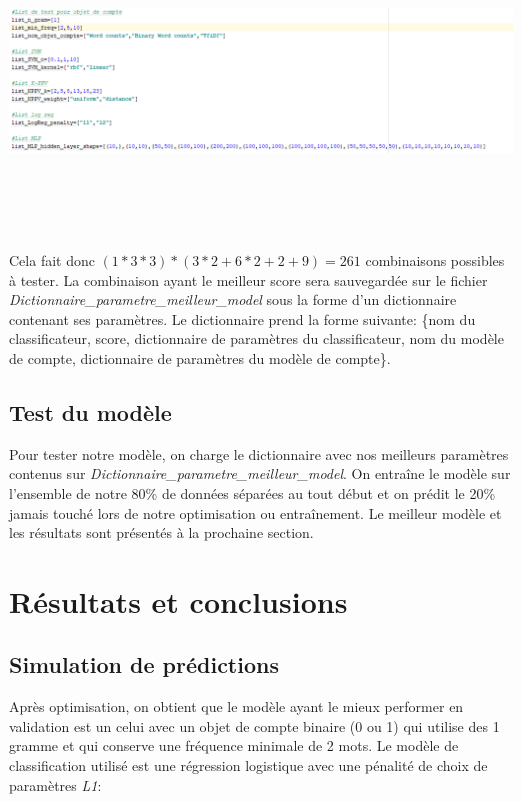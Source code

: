 \documentclass[12pt,french]{article}
\begin{document}
\includegraphics[width=\linewidth,height=8cm]{list_param}

Cela fait donc $(1*3*3) *(3*2 + 6*2 + 2 + 9)=261$ combinaisons possibles à tester. La combinaison ayant le meilleur score sera sauvegardée sur le fichier \emph{Dictionnaire\_parametre\_meilleur\_model} sous la forme d'un dictionnaire contenant ses paramètres. Le dictionnaire prend la forme suivante: \{nom du classificateur, score, dictionnaire de paramètres du classificateur, nom du modèle de compte, dictionnaire de paramètres du modèle de compte\}.

\subsection*{Test du modèle}
Pour tester notre modèle, on charge le dictionnaire avec nos meilleurs paramètres contenus sur \emph{Dictionnaire\_parametre\_meilleur\_model}. On entraîne le modèle sur l'ensemble de notre 80\% de données séparées au tout début et on prédit le 20\% jamais touché lors de notre optimisation ou entraînement. Le meilleur modèle et les résultats sont présentés à la prochaine section.

\clearpage




\section{Résultats et conclusions}
\subsection*{Simulation de prédictions}
Après optimisation, on obtient que le modèle ayant le mieux performer en validation est un celui avec un objet de compte binaire (0 ou 1) qui utilise des 1 gramme et qui conserve une fréquence minimale de 2 mots. Le modèle de classification utilisé est une régression logistique avec une pénalité de choix de paramètres \emph{L1}:
\end{document}
